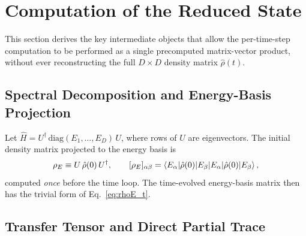 \documentclass[12pt,a4paper]{article}
\newcommand{\Ham}{\hat{H}}
\newcommand{\rhohat}{\hat{\rho}}
\begin{document}





\clearpage
\newpage
\appendix

\section{Computation of the Reduced State}
\label{app:numerics}

This section derives the key intermediate objects that allow the per-time-step
computation to be performed as a single precomputed matrix-vector product,
without ever reconstructing the full $D\times D$ density
matrix $\rhohat(t)$.

\subsection{Spectral Decomposition and Energy-Basis Projection}
\label{app:spectral}

Let $\Ham = U^\dagger\,\mathrm{diag}(E_1,\ldots,E_D)\,U$, where rows of $U$ are
eigenvectors.  The initial density matrix projected to the energy basis is
\begin{equation}
  \rho_E \equiv U\,\rhohat(0)\,U^\dagger,
  \qquad [\rho_E]_{\alpha\beta} = \braket{E_\alpha|\rhohat(0)|E_\beta},
  \label{app:rhoE}
\end{equation}
computed \emph{once} before the time loop.  The time-evolved energy-basis
matrix then has the trivial form of Eq.~\eqref{eq:rhoE_t}.

\subsection{Transfer Tensor and Direct Partial Trace}
\label{app:transfer}
\end{document}
